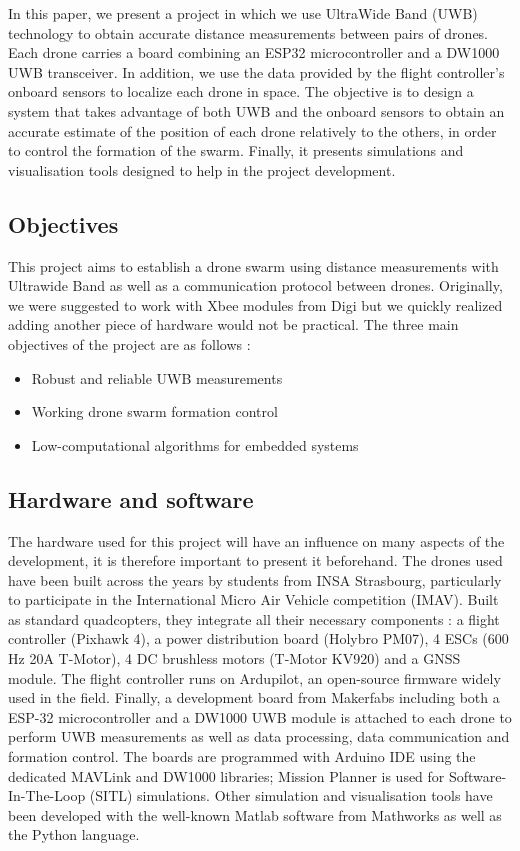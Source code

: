 \documentclass[conference]{IEEEtran}
\begin{document}
In this paper, we present a project in which  we use UltraWide Band (UWB) technology to obtain accurate distance measurements between pairs of drones. Each drone carries a board combining an ESP32 microcontroller and a DW1000 UWB transceiver. In addition, we use the data provided by the flight controller’s onboard sensors to localize each drone in space. The objective is to design a system that takes advantage of both UWB and the onboard sensors to obtain an accurate estimate of the position of each drone relatively to the others, in order to control the formation of the swarm. Finally, it presents simulations and visualisation tools designed to help in the project development.

\subsection{Objectives}
This project aims to establish a drone swarm using distance measurements with Ultrawide Band as well as a communication protocol between drones. Originally, we were suggested to work with Xbee modules from Digi but we quickly realized adding another piece of hardware would not be practical. The three main objectives of the project are as follows : 

\begin{itemize}
    \item Robust and reliable UWB measurements
    \item Working drone swarm formation control
    \item Low-computational algorithms for embedded systems
\end{itemize}

\subsection{Hardware and software}

The hardware used for this project will have an influence on many aspects of the development, it is therefore important to present it beforehand. The drones used have been built across the years by students from INSA Strasbourg, particularly to participate in the International Micro Air Vehicle competition (IMAV). Built as standard quadcopters, they integrate all their necessary components : a flight controller (Pixhawk 4), a power distribution board (Holybro PM07), 4 ESCs (600 Hz 20A T-Motor), 4 DC brushless motors (T-Motor KV920) and a GNSS module. The flight controller runs on Ardupilot, an open-source firmware widely used in the field. Finally, a development board from Makerfabs including both a ESP-32 microcontroller and a DW1000 UWB module is attached to each drone to perform UWB measurements as well as data processing, data communication and formation control. The boards are programmed with Arduino IDE using the dedicated MAVLink and DW1000 libraries; Mission Planner is used for Software-In-The-Loop (SITL) simulations. Other simulation and visualisation tools have been developed with the well-known Matlab software from Mathworks as well as the Python language. 
\end{document}
